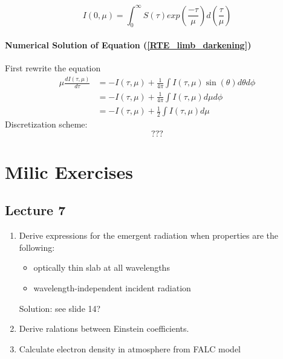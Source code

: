 \documentclass[../main/main.tex]{subfiles}
\begin{document}
\begin{equation}
I(0,\mu) = \int_0^{\infty} S(\tau) exp\left( \frac{-\tau}{\mu} \right) d\left( \frac{\tau}{\mu} \right)
\end{equation}

\paragraph{Numerical Solution of Equation (\ref{RTE_limb_darkening})}
First rewrite the equation
\begin{equation}
\begin{aligned}
\mu \frac{dI(\tau,\mu)}{d\tau} 
&= -I(\tau,\mu)  + \frac{1}{4\pi} \int I(\tau,\mu) \sin(\theta) d\theta d\phi 
\\ &= -I(\tau,\mu)  + \frac{1}{4\pi} \int I(\tau,\mu) d\mu d\phi 
\\ &= -I(\tau,\mu)  + \frac{1}{2} \int I(\tau,\mu) d\mu 
\end{aligned}
\end{equation}
Discretization scheme:
\begin{equation}
???
\end{equation}

\noindent{}

\newpage
\section{Milic Exercises}
\subsection{Lecture 7}
\begin{enumerate}
\item Derive expressions for the emergent radiation when properties are the following:
\begin{itemize}
\item optically thin slab at all wavelengths
\item wavelength-independent incident radiation
\end{itemize}
Solution: see slide 14?

\item Derive ralations between Einstein coefficients.

\item Calculate electron density in atmosphere from FALC model
\end{enumerate}
\end{document}
